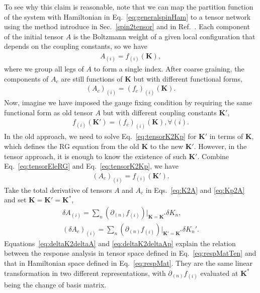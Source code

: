 \documentclass[aps,prb,reprint,superscriptaddress]{revtex4-2}
\begin{document}
To see why this claim is reasonable, note that we can map the partition
function of the system with Hamiltonian in Eq.~\eqref{eq:generalspinHam}
to a tensor network using the method introduce in
Sec.~\ref{spin2tensor} and
in Ref.~\cite{trg}. Each component of the initial tensor $A$ is the
Boltzmann weight of a given local configuration that depends on the
coupling constants, so we have 
%
\begin{align}\label{eq:K2A}
    A_{(i)} = f_{(i)}\left(\mathbf{K}\right),
\end{align}
%
where we group all legs of $A$ to form a single index. After coarse
graining, the components of $A_c$ are still functions of $\mathbf{K}$ but
with different functional forms,
%
\begin{align}\label{eq:tensorEleRG}
    \left(A_c\right)_{(i)} =
\left(f_c\right)_{(i)}\left(\mathbf{K}\right).
\end{align}
%
Now, imagine we have imposed the gauge fixing condition by requiring the
same functional form as old tensor $A$ but with different coupling
constants $\mathbf{K}'$, 
%
\begin{align}\label{eq:tensorK2Kp}
    f_{(i)}\left(\mathbf{K}'\right) =
    \left(f_c\right)_{(i)}\left(\mathbf{K}\right), \forall (i).
\end{align}
%
In the old approach, we need to solve Eq.~\eqref{eq:tensorK2Kp} for
$\mathbf{K}'$ in terms of $\mathbf{K}$, which defines the RG equation
from the old $\mathbf{K}$ to the new $\mathbf{K}'$. However, in the
tensor approach, it is enough to know the existence of such
$\mathbf{K}'$. Combine Eq.~\eqref{eq:tensorEleRG} and
Eq.~\eqref{eq:tensorK2Kp}, we have
%
\begin{align}\label{eq:Kp2A}
    \left(A_c\right)_{(i)} = f_{(i)}\left(\mathbf{K}'\right).
\end{align}
%
Take the total derivative of tensors $A$ and $A_c$ in Eqs.~\eqref{eq:K2A}
and \eqref{eq:Kp2A} and set $\mathbf{K} = \mathbf{K}' = \mathbf{K}^*$,
%
\begin{align}
    \delta A_{(i)} = \sum_n \left(\partial_{(n)}
    f_{(i)}\right)\Bigr|_{\mathbf{K} = \mathbf{K}^*} \delta K_n,
    \label{eq:deltaK2deltaA} \\
    \left(\delta A_c \right)_{(i)} = \sum_n \left(\partial_{(n)}
    f_{(i)}\right)\Bigr|_{\mathbf{K}' = \mathbf{K}^*} \delta
    K_n'.\label{eq:deltaK2deltaAp}  
\end{align}
%
Equations~\eqref{eq:deltaK2deltaA} and \eqref{eq:deltaK2deltaAp} explain
the relation between the response analysis in tensor space defined in
Eq.~\eqref{eq:respMatTen} and that in Hamiltonian space defined in
Eq.~\eqref{eq:respMat}. They are the same linear transformation in two
different representations, with $\partial_{(n)}f_{(i)}$ evaluated at
$\mathbf{K}^*$ being the change of basis matrix.
%
\end{document}
